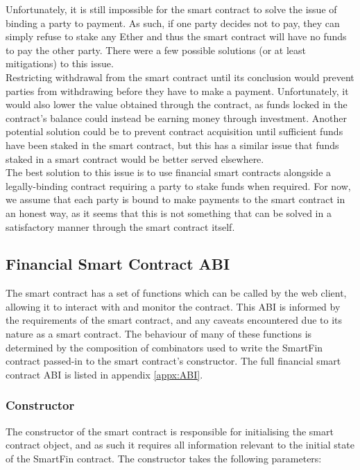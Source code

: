 Unfortunately, it is still impossible for the smart contract to solve the issue of binding a party to payment. As such, if one party decides not to pay, they can simply refuse to stake any Ether and thus the smart contract will have no funds to pay the other party. There were a few possible solutions (or at least mitigations) to this issue. \\

Restricting withdrawal from the smart contract until its conclusion would prevent parties from withdrawing before they have to make a payment. Unfortunately, it would also lower the value obtained through the contract, as funds locked in the contract's balance could instead be earning money through investment. Another potential solution could be to prevent contract acquisition until sufficient funds have been staked in the smart contract, but this has a similar issue that funds staked in a smart contract would be better served elsewhere. \\

The best solution to this issue is to use financial smart contracts alongside a legally-binding contract requiring a party to stake funds when required. For now, we assume that each party is bound to make payments to the smart contract in an honest way, as it seems that this is not something that can be solved in a satisfactory manner through the smart contract itself.


\subsection{Financial Smart Contract ABI} \label{smart-contract-ABI}

The smart contract has a set of functions which can be called by the web client, allowing it to interact with and monitor the contract. This ABI is informed by the requirements of the smart contract, and any caveats encountered due to its nature as a smart contract. The behaviour of many of these functions is determined by the composition of combinators used to write the SmartFin contract passed-in to the smart contract's constructor. The full financial smart contract ABI is listed in appendix \ref{appx:ABI}.


\subsubsection{Constructor}

The constructor of the smart contract is responsible for initialising the smart contract object, and as such it requires all information relevant to the initial state of the SmartFin contract. The constructor takes the following parameters: \\

